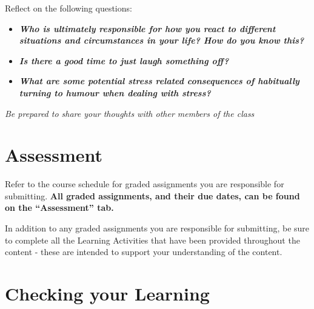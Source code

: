 \documentclass[
]{book}
\providecommand{\tightlist}{%
  \setlength{\itemsep}{0pt}\setlength{\parskip}{0pt}}
\begin{document}
\begin{reflect}
Reflect on the following questions:

\begin{itemize}
\tightlist
\item
  \textbf{\emph{Who is ultimately responsible for how you react to different situations and circumstances in your life? How do you know this?}}
\item
  \textbf{\emph{Is there a good time to just laugh something off?}}\\
\item
  \textbf{\emph{What are some potential stress related consequences of habitually turning to humour when dealing with stress?}}
\end{itemize}

\emph{Be prepared to share your thoughts with other members of the class}
\end{reflect}

\hypertarget{assessment-8}{%
\section*{Assessment}\label{assessment-8}}

\begin{assessment}
Refer to the course schedule for graded assignments you are responsible for submitting. \textbf{All graded assignments, and their due dates, can be found on the ``Assessment'' tab.}

In addition to any graded assignments you are responsible for submitting, be sure to complete all the Learning Activities that have been provided throughout the content - these are intended to support your understanding of the content.
\end{assessment}

\hypertarget{checking-your-learning-8}{%
\section*{Checking your Learning}\label{checking-your-learning-8}}
\end{document}
